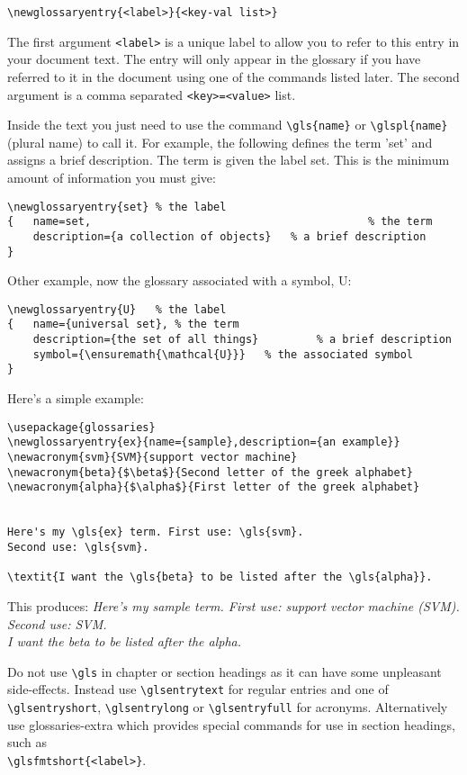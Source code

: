 \verb|\newglossaryentry{<label>}{<key-val list>}|

The first argument \verb|<label>| is a unique label to allow you to refer to this entry in your document text. The entry will only appear in the glossary if you have referred to it in the document using one of the commands listed later. The second argument is a comma separated \verb|<key>=<value>| list.

Inside the text you just need to use the command \verb|\gls{name}| or \verb|\glspl{name}| (plural name) to call it. For example, the following defines the term 'set' and assigns a brief description. The term is given the label set. This is the minimum amount of information you must give:

\begin{verbatim}
\newglossaryentry{set} % the label
{	name=set,            								% the term
 	description={a collection of objects} 	% a brief description
}
 \end{verbatim}

Other example, now the glossary associated with a symbol, \gls{U}:

\begin{verbatim}
\newglossaryentry{U}   % the label
{	name={universal set}, % the term
 	description={the set of all things} 		% a brief description
 	symbol={\ensuremath{\mathcal{U}}}  	% the associated symbol 
}
 \end{verbatim}
 
Here's a simple example:
\begin{verbatim}
\usepackage{glossaries} 
\newglossaryentry{ex}{name={sample},description={an example}}
\newacronym{svm}{SVM}{support vector machine}
\newacronym{beta}{$\beta$}{Second letter of the greek alphabet}
\newacronym{alpha}{$\alpha$}{First letter of the greek alphabet}


Here's my \gls{ex} term. First use: \gls{svm}. 
Second use: \gls{svm}.

\textit{I want the \gls{beta} to be listed after the \gls{alpha}}.

\end{verbatim}

This produces: \textit{Here's my sample term. First use: support vector machine (SVM).\\ Second use: SVM.\\
I want the \gls{beta} to be listed after the \gls{alpha}.}

Do not use \verb|\gls| in chapter or section headings as it can have some unpleasant side-effects. Instead use \verb|\glsentrytext| for regular entries and one of \verb|\glsentryshort|, \verb|\glsentrylong| or \verb|\glsentryfull| for acronyms. Alternatively use glossaries-extra which provides special commands for use in section headings, such as \\ \verb|\glsfmtshort{<label>}|.

